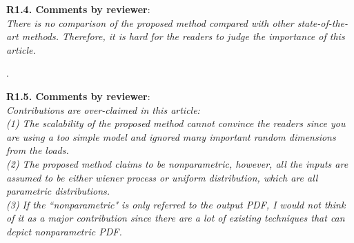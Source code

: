 \documentclass[12pt,onecolumn]{IEEEtran}
\newcommand{\blue}{\color{blue}}
\newcommand{\red}{\textcolor{red}}
\newcommand{\nib}{\noindent  {\bf Response:} }
\begin{document}
\noindent
{\bf R1.4. Comments by reviewer}:\\
{\em There is no comparison of the proposed method compared with other state-of-the-art methods. Therefore, it is hard for the readers to judge the importance of this article.}

{\nib{ \blue {\red{TBD}}.}}


\noindent
{\bf R1.5. Comments by reviewer}:\\
{\em Contributions are over-claimed in this article:\\
(1) The scalability of the proposed method cannot convince the readers since you are using a too simple model and ignored many important random dimensions from the loads.\\
(2) The proposed method claims to be nonparametric, however, all the inputs are assumed to be either wiener process or uniform distribution, which are all parametric distributions.\\
(3) If the ``nonparametric" is only referred to the output PDF, I would not think of it as a major contribution since there are a lot of existing techniques that can depict nonparametric PDF.}
\end{document}
